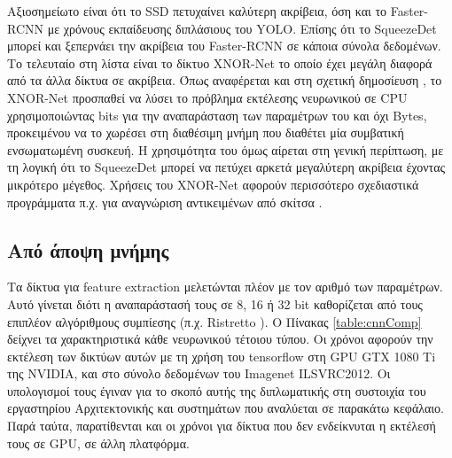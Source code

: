 Αξιοσημείωτο είναι ότι το SSD πετυχαίνει καλύτερη ακρίβεια, όση και το Faster-RCNN με χρόνους εκπαίδευσης διπλάσιους του YOLO. Επίσης ότι το SqueezeDet μπορεί και ξεπερνάει την ακρίβεια του Faster-RCNN σε κάποια σύνολα δεδομένων. Το τελευταίο στη λίστα είναι το δίκτυο XNOR-Net το οποίο έχει μεγάλη διαφορά από τα άλλα δίκτυα σε ακρίβεια. Όπως αναφέρεται και στη σχετική δημοσίευση \cite{18}, το XNOR-Net προσπαθεί να λύσει το πρόβλημα εκτέλεσης νευρωνικού σε CPU χρησιμοποιώντας bits για την αναπαράσταση των παραμέτρων του και όχι Bytes, προκειμένου να το χωρέσει στη διαθέσιμη μνήμη που διαθέτει μία συμβατική ενσωματωμένη συσκευή. Η χρησιμότητα του όμως αίρεται στη γενική περίπτωση, με τη λογική ότι το SqueezeDet μπορεί να πετύχει αρκετά μεγαλύτερη ακρίβεια έχοντας μικρότερο μέγεθος. Χρήσεις του XNOR-Net αφορούν περισσότερο σχεδιαστικά προγράμματα π.χ. για αναγνώριση αντικειμένων από σκίτσα \cite{33}.

\subsection*{Από άποψη μνήμης}
Τα δίκτυα για feature extraction μελετώνται πλέον με τον αριθμό των παραμέτρων. Αυτό γίνεται διότι η αναπαράστασή τους σε 8, 16 ή 32 bit καθορίζεται από τους επιπλέον αλγόριθμους συμπίεσης (π.χ. Ristretto \cite{28}). Ο Πίνακας \ref{table:cnnComp} δείχνει τα χαρακτηριστικά κάθε νευρωνικού τέτοιου τύπου. Οι χρόνοι αφορούν την εκτέλεση των δικτύων αυτών με τη χρήση του tensorflow \cite{34} στη GPU GTX 1080 Ti της NVIDIA, και στο σύνολο δεδομένων του Imagenet ILSVRC2012. Οι υπολογισμοί τους έγιναν για το σκοπό αυτής της διπλωματικής στη συστοιχία του εργαστηρίου Αρχιτεκτονικής και συστημάτων που αναλύεται σε παρακάτω κεφάλαιο. Παρά ταύτα, παρατίθενται και οι χρόνοι για δίκτυα που δεν ενδείκνυται η εκτέλεσή τους σε GPU, σε άλλη πλατφόρμα.


